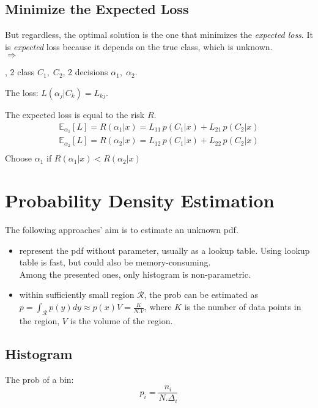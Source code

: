 \subsection{Minimize the Expected Loss}
But regardless, the optimal solution is the one that minimizes the \textit{expected loss}. It is \textit{expected} loss because it depends on the true class, which is unknown.\\
$\Rightarrow$ 

\Eg, 2 class $C_1, \; C_2$, 2 decisions $\alpha_1, \; \alpha_2$.

The loss: $L(\alpha_j | C_k) = L_{kj}$.

The expected loss is equal to the risk $R$.
\begin{align*}
	\mathbb{E}_{\alpha_1}[L] = R(\alpha_1|x) = L_{11}\,p(C_1|x) + L_{21}\,p(C_2|x)\\
	\mathbb{E}_{\alpha_2}[L] = R(\alpha_2|x) = L_{12}\,p(C_1|x) + L_{22}\,p(C_2|x)\\
\end{align*}
Choose $\alpha_1$ if $R(\alpha_1|x) < R(\alpha_2|x)$


\section{Probability Density Estimation}
\label{cha:pdf-estimation}
The following approaches' aim is to estimate an unknown \ac{pdf}.
\begin{itemize}
	\item {} represent the \ac{pdf} without parameter, usually as a lookup table. Using lookup table is fast, but could also be memory-consuming.\\
	Among the presented ones, only histogram is non-parametric.
	\item {} within sufficiently small region $\mathcal{R}$, the \ac{prob} can be estimated as $\displaystyle p = \int_{\mathcal{R}}p(y)dy \approx p(x)V = \frac{K}{N.V}$, where $K$ is the number of data points in the region, $V$ is the volume of the region.
\end{itemize}

\subsection{Histogram}
The \ac{prob} of a bin:
\begin{equation}
	p_i = \frac{n_i}{N.\Delta_i}
\end{equation}

